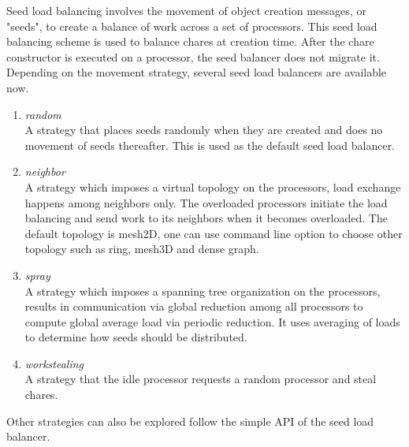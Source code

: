 \label{seedlb}

Seed load balancing involves the movement of object creation messages, or
"seeds", to create a balance of work across a set of processors. 
This seed load balancing scheme is used to balance chares  at creation time.
After the chare constructor is executed on a processor, the seed balancer does not
migrate it.
Depending on the movement strategy, several seed load balancers are available now. 
\begin{enumerate}
\item {\em random}\\  
 A strategy that places seeds randomly when they are created and does
no movement of seeds thereafter. This is used as the default seed 
load balancer.
\item {\em neighbor}\\  
 A strategy which imposes a virtual topology on the processors,
 load exchange happens among neighbors only. The overloaded processors
 initiate the load balancing and send work to its neighbors
 when it becomes overloaded. The default topology is mesh2D, one can use
 command line option to choose other topology such as ring, mesh3D and 
 dense graph.
\item {\em spray}\\  
 A strategy which imposes a spanning tree organization on the processors,
 results in communication via global reduction among all processors 
 to compute global average load via periodic reduction. 
 It uses averaging of loads to determine how seeds should be
distributed.
\item  {\em workstealing} \\
 A strategy that the idle processor requests a random processor and steal 
 chares.
\end{enumerate}

Other strategies can also be explored follow the simple API of the 
seed load balancer.
\linebreak

